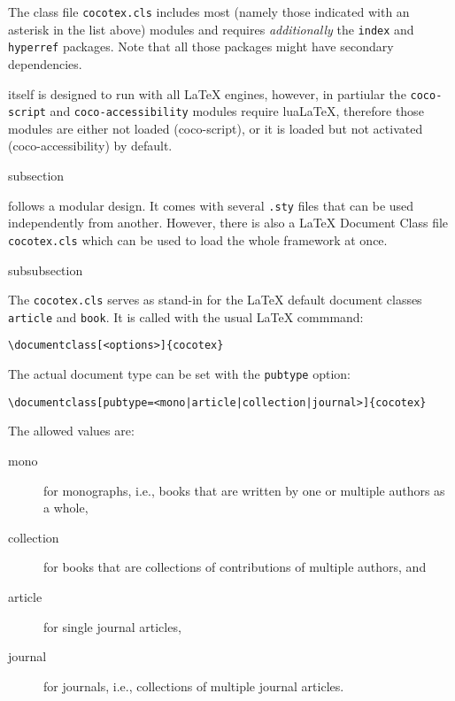 The {\CoCoTeX} class file \texttt{cocotex.cls} includes most (namely
those indicated with an asterisk in the list above) {\CoCoTeX} modules
and requires \textit{additionally} the \texttt{index} and
\texttt{hyperref} packages. Note that all those packages might have
secondary dependencies.

{\CoCoTeX} itself is designed to run with all {\LaTeX} engines,
however, in partiular the \texttt{coco-script} and
\texttt{coco-accessibility} modules require {lua\LaTeX}, therefore
those modules are either not loaded (coco-script), or it is
loaded but not activated (coco-accessibility) by default.


\begin{Heading}{subsection}
\end{Heading}

{\CoCoTeX} follows a modular design. It comes with several
\lstinline{.sty} files that can be used independently from
another. However, there is also a {\LaTeX} Document Class file
\lstinline{cocotex.cls} which can be used to load the whole framework
at once.

\begin{Heading}{subsubsection}
\end{Heading}

The \lstinline{cocotex.cls} serves as stand-in for the {\LaTeX}
default document classes \lstinline{article} and \lstinline{book}. It
is called with the usual {\LaTeX} commmand:
\begin{lstlisting}[style=tex]
\documentclass[<options>]{cocotex}
\end{lstlisting}

The actual document type can be set with the \lstinline{pubtype} option:
\begin{lstlisting}[style=tex]
\documentclass[pubtype=<mono|article|collection|journal>]{cocotex}
\end{lstlisting}
The allowed values are:
\begin{description}
\item[\ttfamily mono] for monographs, i.e., books that are written by one or
  multiple authors as a whole,
\item[\ttfamily collection] for books that are collections of contributions of
  multiple authors, and
\item[\ttfamily article] for single journal articles,
\item[\ttfamily journal] for journals, i.e., collections of multiple journal
  articles.
\end{description}


